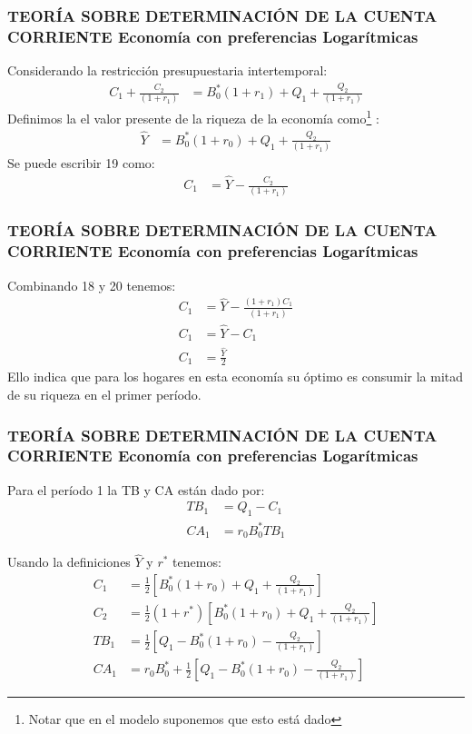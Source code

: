 \documentclass[10pt, xcolor=table, x11names]{beamer}
\begin{document}
\begin{frame}[label=17]
	\frametitle{{\normalsize TEORÍA SOBRE DETERMINACIÓN DE LA CUENTA CORRIENTE} {Economía con preferencias Logarítmicas}}
	Considerando la restricción presupuestaria intertemporal: 
	\begin{align}
	C_{1}+\frac{C_{2}}{(1+r_{1})}&=B_{0}^{*}(1+r_{1})+	Q_{1}+\frac{Q_{2}}{(1+r_{1})}
	\end{align}
	Definimos la el valor presente de la riqueza de la economía como\footnote{Notar que en el modelo suponemos que esto está dado} :
	\begin{align}
	\hat{Y}&=B_{0}^{*}(1+r_{0})+Q_{1}+\frac{Q_{2}}{(1+r_{1})}\nonumber 
	\end{align}
	Se puede escribir 19 como:
	\begin{align}
	C_{1}&=\hat{Y}-\frac{C_{2}}{(1+r_{1})}
	\end{align}
\end{frame}

\begin{frame}[label=18]
	\frametitle{{\normalsize TEORÍA SOBRE DETERMINACIÓN DE LA CUENTA CORRIENTE} {Economía con preferencias Logarítmicas}}
	Combinando 18 y 20 tenemos:
	\begin{align}
		C_{1}&=\hat{Y}-\frac{(1+r_{1})C_{1}}{(1+r_{1})}\nonumber \\
		C_{1}&=\hat{Y}-C_{1}\nonumber \\
		C_{1}&=\frac{\hat{Y}}{2} 
	\end{align}
	Ello indica que para los hogares en esta economía su óptimo es consumir la mitad de su riqueza en el primer período.
\end{frame}

\begin{frame}[label=19]
	\frametitle{{\normalsize TEORÍA SOBRE DETERMINACIÓN DE LA CUENTA CORRIENTE} {Economía con preferencias Logarítmicas}}
	Para el período 1 la TB y CA están dado por:\\
	
	\begin{align}
		TB_{1}&=Q_{1}-C_{1} \nonumber \\
		CA_{1}&=r_{0}B_{0}^{*}TB_{1}\nonumber 
	\end{align}
	
	Usando la definiciones $ \hat{Y}$ y $r^{*}$ tenemos:\\
	
	\begin{align}
	C_{1}&=\frac{1}{2}[ B_{0}^{*}(1+r_{0})+Q_{1}+\frac{Q_{2}}{(1+r_{1})}] \\
	C_{2}&=\frac{1}{2}(1+r^{*})[ B_{0}^{*}(1+r_{0})+Q_{1}+\frac{Q_{2}}{(1+r_{1})}] \\
		TB_{1}&=\frac{1}{2}[ Q_{1}-B_{0}^{*}(1+r_{0})-\frac{Q_{2}}{(1+r_{1})}] \\
		CA_{1}&=r_{0}B_{0}^{*}+\frac{1}{2}[ Q_{1}-B_{0}^{*}(1+r_{0})-\frac{Q_{2}}{(1+r_{1})}]
	\end{align}
	
\end{frame}
\end{document}
